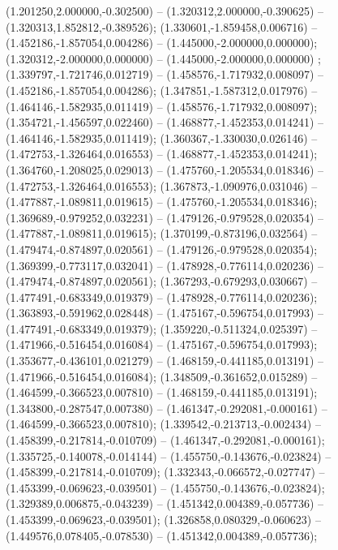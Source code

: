  (1.201250,2.000000,-0.302500) -- (1.320312,2.000000,-0.390625) -- (1.320313,1.852812,-0.389526);
 (1.330601,-1.859458,0.006716) -- (1.452186,-1.857054,0.004286) -- (1.445000,-2.000000,0.000000);
 (1.320312,-2.000000,0.000000) -- (1.445000,-2.000000,0.000000) ;
 (1.339797,-1.721746,0.012719) -- (1.458576,-1.717932,0.008097) -- (1.452186,-1.857054,0.004286);
 (1.347851,-1.587312,0.017976) -- (1.464146,-1.582935,0.011419) -- (1.458576,-1.717932,0.008097);
 (1.354721,-1.456597,0.022460) -- (1.468877,-1.452353,0.014241) -- (1.464146,-1.582935,0.011419);
 (1.360367,-1.330030,0.026146) -- (1.472753,-1.326464,0.016553) -- (1.468877,-1.452353,0.014241);
 (1.364760,-1.208025,0.029013) -- (1.475760,-1.205534,0.018346) -- (1.472753,-1.326464,0.016553);
 (1.367873,-1.090976,0.031046) -- (1.477887,-1.089811,0.019615) -- (1.475760,-1.205534,0.018346);
 (1.369689,-0.979252,0.032231) -- (1.479126,-0.979528,0.020354) -- (1.477887,-1.089811,0.019615);
 (1.370199,-0.873196,0.032564) -- (1.479474,-0.874897,0.020561) -- (1.479126,-0.979528,0.020354);
 (1.369399,-0.773117,0.032041) -- (1.478928,-0.776114,0.020236) -- (1.479474,-0.874897,0.020561);
 (1.367293,-0.679293,0.030667) -- (1.477491,-0.683349,0.019379) -- (1.478928,-0.776114,0.020236);
 (1.363893,-0.591962,0.028448) -- (1.475167,-0.596754,0.017993) -- (1.477491,-0.683349,0.019379);
 (1.359220,-0.511324,0.025397) -- (1.471966,-0.516454,0.016084) -- (1.475167,-0.596754,0.017993);
 (1.353677,-0.436101,0.021279) -- (1.468159,-0.441185,0.013191) -- (1.471966,-0.516454,0.016084);
 (1.348509,-0.361652,0.015289) -- (1.464599,-0.366523,0.007810) -- (1.468159,-0.441185,0.013191);
 (1.343800,-0.287547,0.007380) -- (1.461347,-0.292081,-0.000161) -- (1.464599,-0.366523,0.007810);
 (1.339542,-0.213713,-0.002434) -- (1.458399,-0.217814,-0.010709) -- (1.461347,-0.292081,-0.000161);
 (1.335725,-0.140078,-0.014144) -- (1.455750,-0.143676,-0.023824) -- (1.458399,-0.217814,-0.010709);
 (1.332343,-0.066572,-0.027747) -- (1.453399,-0.069623,-0.039501) -- (1.455750,-0.143676,-0.023824);
 (1.329389,0.006875,-0.043239) -- (1.451342,0.004389,-0.057736) -- (1.453399,-0.069623,-0.039501);
 (1.326858,0.080329,-0.060623) -- (1.449576,0.078405,-0.078530) -- (1.451342,0.004389,-0.057736);

